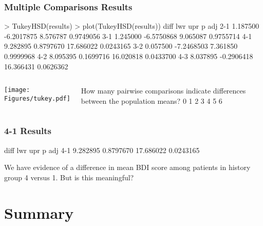 \begin{frame}[fragile]
\frametitle{Multiple Comparisons Results}
\begin{lcverbatim}
> TukeyHSD(results)
> plot(TukeyHSD(results))
        diff        lwr       upr     p adj
2-1 1.187500 -6.2017875  8.576787 0.9749056
3-1 1.245000 -6.5750868  9.065087 0.9755714
4-1 9.282895  0.8797670 17.686022 0.0243165
3-2 0.057500 -7.2468503  7.361850 0.9999968
4-2 8.095395  0.1699716 16.020818 0.0433700
4-3 8.037895 -0.2906418 16.366431 0.0626362
\end{lcverbatim}
\begin{columns}
\texttt{[image: Figures/tukey.pdf]}
\begin{clicker}{How many pairwise comparisons indicate differences between the population means?}
\hspace{0.1in} 0  \hspace{0.1in} 1 \hspace{0.1in}  2 \hspace{0.1in}  3  \hspace{0.1in} 4 \hspace{0.1in}  5 \hspace{0.1in}  6
\end{clicker}
\end{columns}
\end{frame}

\begin{frame}[fragile]
\frametitle{4-1 Results}
\begin{lcverbatim}
        diff        lwr       upr     p adj
4-1 9.282895  0.8797670 17.686022 0.0243165
\end{lcverbatim}
We have evidence of a difference in mean BDI score among patients in history group 4 versus 1.  But is this meaningful?
\vskip200pt
\end{frame}

\section[Summary]{Summary}
\begin{frame}
\end{frame}


